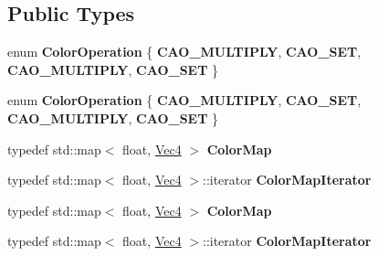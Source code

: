 \subsection*{Public Types}
\begin{DoxyCompactItemize}
\item 
\mbox{\label{classPUColorAffector_a1e6bfa296a6738fb31513b0d1c7ac42c}} 
enum {\bfseries Color\+Operation} \{ {\bfseries C\+A\+O\+\_\+\+M\+U\+L\+T\+I\+P\+LY}, 
{\bfseries C\+A\+O\+\_\+\+S\+ET}, 
{\bfseries C\+A\+O\+\_\+\+M\+U\+L\+T\+I\+P\+LY}, 
{\bfseries C\+A\+O\+\_\+\+S\+ET}
 \}
\item 
\mbox{\label{classPUColorAffector_a1e6bfa296a6738fb31513b0d1c7ac42c}} 
enum {\bfseries Color\+Operation} \{ {\bfseries C\+A\+O\+\_\+\+M\+U\+L\+T\+I\+P\+LY}, 
{\bfseries C\+A\+O\+\_\+\+S\+ET}, 
{\bfseries C\+A\+O\+\_\+\+M\+U\+L\+T\+I\+P\+LY}, 
{\bfseries C\+A\+O\+\_\+\+S\+ET}
 \}
\item 
\mbox{\label{classPUColorAffector_af2d3a65eb6f3b152fd97bec02a12c820}} 
typedef std\+::map$<$ float, \hyperlink{classVec4}{Vec4} $>$ {\bfseries Color\+Map}
\item 
\mbox{\label{classPUColorAffector_a1e02dd0efdd65950e2f180ff4737d39d}} 
typedef std\+::map$<$ float, \hyperlink{classVec4}{Vec4} $>$\+::iterator {\bfseries Color\+Map\+Iterator}
\item 
\mbox{\label{classPUColorAffector_af2d3a65eb6f3b152fd97bec02a12c820}} 
typedef std\+::map$<$ float, \hyperlink{classVec4}{Vec4} $>$ {\bfseries Color\+Map}
\item 
\mbox{\label{classPUColorAffector_a1e02dd0efdd65950e2f180ff4737d39d}} 
typedef std\+::map$<$ float, \hyperlink{classVec4}{Vec4} $>$\+::iterator {\bfseries Color\+Map\+Iterator}
\end{DoxyCompactItemize}
